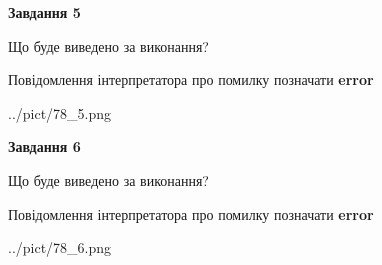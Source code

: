 \documentclass[12pt, ukrainian]{article}
\begin{document}
{{\begin {center}\textbf{Завдання 5}\end {center}}\par
Що буде виведено за виконання? \par
Повідомлення інтерпретатора про помилку позначати \textbf{error}

\begin{center}
	{../pict/78_5.png}
\end{center}
\newpage

{\begin {center}\textbf{Завдання 6}\end {center}}\par
Що буде виведено за виконання? \par
Повідомлення інтерпретатора про помилку позначати \textbf{error}

\begin{center}
	{../pict/78_6.png}
\end{center}
\newpage

}
\end{document}

